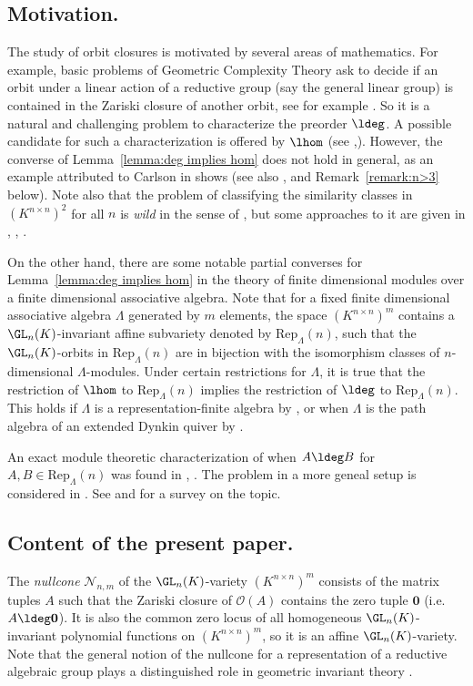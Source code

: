 \documentclass[12pt]{amsart}
\newcommand{\field}{K}
\begin{document}
\subsection{Motivation.} 
The study of orbit closures is motivated by several areas of mathematics.  
For example, basic problems of Geometric Complexity Theory ask to decide if an orbit under a linear action of a reductive group (say the general linear group) is contained in the Zariski closure of another orbit, 
see for example \cite{landsberg}. So it is a natural and challenging problem 
to characterize the preorder $\ldeg$. A possible candidate for such a characterization is offered 
by $\lhom$ (see \cite{CH85},\cite{HL03}). However, 
the converse of Lemma~\ref{lemma:deg implies hom} does not hold in general, 
as an example attributed to Carlson in \cite{Riedtmann1} shows (see also \cite{DKMV}, 
and Remark~\ref{remark:n>3} below). 
Note also that the problem of classifying the similarity classes in $(\field^{n\times n})^2$ for all $n$ 
is \emph{wild} in the sense of \cite{Drozd}, but some approaches to it are given in 
\cite{Bongartz-Friedland}, \cite{lebruyn2}, \cite{Belitskii}. 

On the other hand, there are some notable partial converses for Lemma~\ref{lemma:deg implies hom} 
in the theory of finite dimensional modules over a finite dimensional associative algebra. 
Note that for a fixed finite dimensional associative algebra $\Lambda$ generated by $m$ elements, 
the space $(\field^{n\times n})^m$ contains a $\GL_n(\field)$-invariant affine subvariety 
denoted by $\mathrm{Rep}_\Lambda(n)$, such 
that the $\GL_n(\field)$-orbits in $\mathrm{Rep}_\Lambda(n)$ are in bijection with the isomorphism classes of 
$n$-dimensional $\Lambda$-modules. Under certain restrictions for $\Lambda$, it is true that the 
restriction of $\lhom$ to $\mathrm{Rep}_\Lambda(n)$ implies the restriction of $\ldeg$ to 
$\mathrm{Rep}_\Lambda(n)$. This holds if $\Lambda$ is a representation-finite algebra by 
\cite{Zwara:PAMS}, 
or when $\Lambda$ is the path algebra of an extended Dynkin quiver 
by \cite{Bongartz1}. 

An exact module theoretic characterization of when $A\ldeg B$ for 
$A,B\in \mathrm{Rep}_\Lambda(n)$ was found in \cite{Riedtmann1}, \cite{Zwara1}. 
The problem in a more geneal setup is considered in \cite{Forbregd}. 
See \cite{Smalo} and \cite{Nornes} for a survey on the topic. 
 
\subsection{Content of the present paper.} 
The \emph{nullcone} $\mathcal{N}_{n,m}$ of the $\GL_n(\field)$-variety 
$(\field^{n\times n})^m$ consists of the matrix tuples $A$ such that the 
Zariski closure of $\mathcal{O}(A)$ contains the 
zero tuple $\mathbf{0}$ (i.e. $A\ldeg \mathbf{0}$). 
It is also the common zero locus of all homogeneous $\GL_n(\field)$-invariant polynomial functions 
on $(\field^{n\times n})^m$, so it is an affine $\GL_n(\field)$-variety. 
Note that the general notion of the nullcone for a representation of a reductive algebraic group plays 
a distinguished role in geometric invariant theory \cite{MFK94}. 
\end{document}
